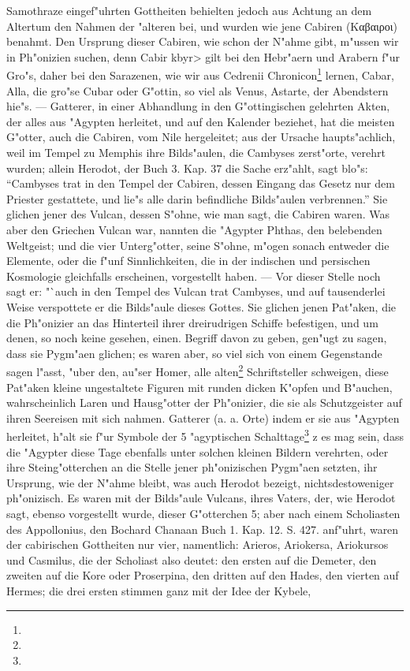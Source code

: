\documentclass[a4paper, 11pt, oneside, polutonikogreek, german]{article}
\begin{document}
Samothraze eingef"uhrten Gottheiten behielten jedoch aus Achtung an dem Altertum den Nahmen der "alteren bei, und wurden wie jene Cabiren (Καβαιροι) benahmt. Den Ursprung dieser Cabiren, wie schon der N"ahme gibt, m"ussen wir in Ph"onizien suchen, denn Cabir \<kbyr> gilt bei den Hebr"aern und Arabern f"ur Gro"s, daher bei den Sarazenen, wie wir aus Cedrenii Chronicon\footnote{} lernen, Cabar, Alla, die gro"se Cubar oder G"ottin, so viel als Venus, Astarte, der Abendstern hie"s. --- Gatterer, in einer Abhandlung in den G"ottingischen gelehrten Akten, der alles aus "Agypten herleitet, und auf den Kalender beziehet, hat die meisten G"otter, auch die Cabiren, vom Nile hergeleitet; aus der Ursache haupts"achlich, weil im Tempel zu Memphis ihre Bilds"aulen, die Cambyses zerst"orte, verehrt wurden; allein Herodot, der Buch 3. Kap. 37 die Sache erz"ahlt, sagt blo"s: "`Cambyses trat in den Tempel der Cabiren, dessen Eingang das Gesetz nur dem Priester gestattete, und lie"s alle darin befindliche Bilds"aulen verbrennen."' Sie glichen jener des Vulcan, dessen S"ohne, wie man sagt, die Cabiren waren. Was aber den Griechen Vulcan war, nannten die "Agypter Phthas, den belebenden Weltgeist; und die vier Unterg"otter, seine S"ohne, m"ogen sonach entweder die Elemente, oder die f"unf Sinnlichkeiten, die in der indischen und persischen Kosmologie gleichfalls erscheinen, vorgestellt haben. --- Vor dieser Stelle noch sagt er: "`auch in den Tempel des Vulcan trat Cambyses, und auf tausenderlei Weise verspottete er die Bilds"aule dieses Gottes. Sie glichen jenen Pat"aken, die die Ph"onizier an das Hinterteil ihrer dreirudrigen Schiffe befestigen, und um denen, so noch keine gesehen, einen. Begriff davon zu geben, gen"ugt zu sagen, dass sie Pygm"aen glichen; es waren aber, so viel sich von einem Gegenstande sagen l"asst, "uber den, au"ser Homer, alle alten\footnote{} Schriftsteller schweigen, diese Pat"aken kleine ungestaltete Figuren mit runden dicken K"opfen und B"auchen, wahrscheinlich Laren und Hausg"otter der Ph"onizier, die sie als Schutzgeister auf ihren Seereisen mit sich nahmen. Gatterer (a. a. Orte) indem er sie aus "Agypten herleitet, h"alt sie f"ur Symbole der 5 "agyptischen Schalttage\footnote{} z es mag sein, dass die "Agypter diese Tage ebenfalls unter solchen kleinen Bildern verehrten, oder ihre Steing"otterchen an die Stelle jener ph"onizischen Pygm"aen setzten, ihr Ursprung, wie der N"ahme bleibt, was auch Herodot bezeigt, nichtsdestoweniger ph"onizisch. Es waren mit der Bilds"aule Vulcans, ihres Vaters, der, wie Herodot sagt, ebenso vorgestellt wurde, dieser G"otterchen 5; aber nach einem Scholiasten des Appollonius, den Bochard Chanaan Buch 1. Kap. 12. S. 427. anf"uhrt, waren der cabirischen Gottheiten nur vier, namentlich: Arieros, Ariokersa, Ariokursos und Casmilus, die der Scholiast also deutet: den ersten auf die Demeter, den zweiten auf die Kore oder Proserpina, den dritten auf den Hades, den vierten auf Hermes; die drei ersten stimmen ganz mit der Idee der Kybele, 
\end{document}
